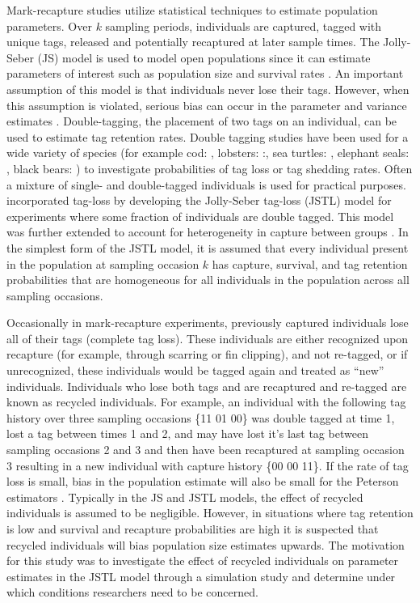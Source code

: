 \documentclass[]{article}
\begin{document}
Mark-recapture studies utilize statistical techniques to estimate
population parameters. Over \(k\) sampling
periods, individuals are captured, tagged with unique tags, released and potentially
recaptured at later sample times. The Jolly-Seber (JS) model \citep{Jolly:1965, Seber:1965}
 is used to model open populations since it
can estimate parameters of interest such as population size and survival
rates \citep{Pollock:1990}. An important assumption of this model is that 
individuals never lose their tags. However, when this assumption is
violated, serious bias can occur in the parameter and variance estimates
\citep{Arnason:1981}. Double-tagging, the placement of two tags on
an individual, can be used to estimate tag retention rates. Double tagging studies have been used for a wide variety of species (for example cod: \citealt{Bjornsson:2011}, lobsters: \citealt{Xu:2014}:, sea turtles: \citealt{Bjorndal:1996}, elephant seals: \citealt{Pistorius:2000}, black bears: \citealt{Diefenbach:1998})   to investigate probabilities of tag loss or tag shedding rates.  Often a
mixture of single- and double-tagged individuals is used for practical
purposes. \cite{Cowen:2006} incorporated tag-loss by developing
the Jolly-Seber tag-loss (JSTL) model for experiments where some
fraction of individuals are double tagged. This model was further
extended to account for heterogeneity in capture between groups \citep{Xu:2014}. In the simplest form of the JSTL model, it is assumed that
every individual present in the population at sampling occasion \(k\)
has capture, survival, and tag retention
probabilities that are homogeneous for all individuals in the population
across all sampling occasions.

Occasionally in mark-recapture experiments, previously captured
individuals lose all of their tags (complete tag loss). These
individuals are either recognized upon recapture (for example, through
scarring or fin clipping), and not re-tagged, or if unrecognized, these
individuals would be tagged again and treated as ``new'' individuals.
Individuals who lose both tags and are recaptured and re-tagged are
known as recycled individuals. For example, an individual with the
following tag history over three sampling occasions \{11 01 00\} was
double tagged at time 1, lost a tag between times 1 and 2, and may have
lost it's last tag between sampling occasions 2 and 3 and then have been
recaptured at sampling occasion 3 resulting in a new individual with
capture history \{00 00 11\}. If the rate of tag loss is small, bias in
the population estimate will also be small for the Peterson estimators
\citep{Seber:1981}. Typically in the JS and JSTL models, the
effect of recycled individuals is assumed to be negligible. However, in
situations where tag retention is low and survival and recapture
probabilities are high it is suspected that recycled individuals will
bias population size estimates upwards. The motivation for this study
was to investigate the effect of recycled individuals on parameter
estimates in the JSTL model through a simulation study and determine
under which conditions researchers need to be concerned.
\end{document}
